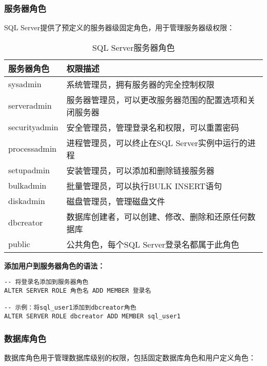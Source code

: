 \subsubsection{服务器角色}

\qquad SQL Server提供了预定义的服务器级固定角色，用于管理服务器级权限：

\begin{table}[H]
  \centering
  \begin{tabularx}{\textwidth}{p{4cm}|X}
    \toprule
    \textbf{服务器角色} & \textbf{权限描述} \\
    \hline
    sysadmin & 系统管理员，拥有服务器的完全控制权限 \\
    serveradmin & 服务器管理员，可以更改服务器范围的配置选项和关闭服务器 \\
    securityadmin & 安全管理员，管理登录名和权限，可以重置密码 \\
    processadmin & 进程管理员，可以终止在SQL Server实例中运行的进程 \\
    setupadmin & 安装管理员，可以添加和删除链接服务器 \\
    bulkadmin & 批量管理员，可以执行BULK INSERT语句 \\
    diskadmin & 磁盘管理员，管理磁盘文件 \\
    dbcreator & 数据库创建者，可以创建、修改、删除和还原任何数据库 \\
    public & 公共角色，每个SQL Server登录名都属于此角色 \\
    \bottomrule
  \end{tabularx}
  \caption{SQL Server服务器角色}
  \label{table:3}
\end{table}

\qquad \textbf{添加用户到服务器角色的语法：}

\begin{mdframed}[backgroundcolor=gray!10]
\begin{verbatim}
-- 将登录名添加到服务器角色
ALTER SERVER ROLE 角色名 ADD MEMBER 登录名

-- 示例：将sql_user1添加到dbcreator角色
ALTER SERVER ROLE dbcreator ADD MEMBER sql_user1
\end{verbatim}
\end{mdframed}

\subsubsection{数据库角色}

\qquad 数据库角色用于管理数据库级别的权限，包括固定数据库角色和用户定义角色：

